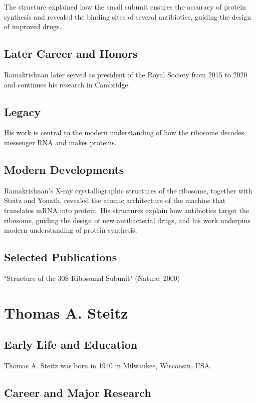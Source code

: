 The structure explained how the small subunit ensures the accuracy of protein synthesis and revealed the binding sites of several antibiotics, guiding the design of improved drugs.

\subsection*{Later Career and Honors}

Ramakrishnan later served as president of the Royal Society from 2015 to 2020 and continues his research in Cambridge.

\subsection*{Legacy}

His work is central to the modern understanding of how the ribosome decodes messenger RNA and makes proteins.

\subsection*{Modern Developments}

Ramakrishnan's X-ray crystallographic structures of the ribosome, together with Steitz and Yonath, revealed the atomic architecture of the machine that translates mRNA into protein. His structures explain how antibiotics target the ribosome, guiding the design of new antibacterial drugs, and his work underpins modern understanding of protein synthesis.

\subsection*{Selected Publications}

"Structure of the 30S Ribosomal Subunit" (Nature, 2000)

\clearpage

\section{Thomas A. Steitz}

\subsection*{Early Life and Education}

Thomas A. Steitz was born in 1940 in Milwaukee, Wisconsin, USA.

\subsection*{Career and Major Research}

